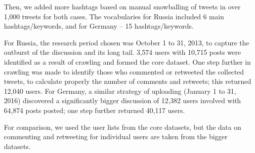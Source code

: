 Then, we added more hashtags based on manual snowballing of tweets in over 1,000 tweets for both cases. The vocabularies for Russia included 6 main hashtags/keywords, and for Germany -- 15 hashtags/keywords.

For Russia, the research period chosen was October 1 to 31, 2013, to capture the outburst of the discussion and its long tail. 3,574 users with 10,715 posts were identified as a result of crawling and formed the core dataset. One step further in crawling was made to identify those who commented or retweeted the collected tweets, to calculate properly the number of comments and retweets; this returned 12,040 users. For Germany, a similar strategy of uploading (January 1 to 31, 2016) discovered a significantly bigger discussion of 12,382 users involved with 64,874 posts posted; one step further returned 40,117 users.

For comparison, we used the user lists from the core datasets, but the data on commenting and retweeting for individual users are taken from the bigger datasets.

